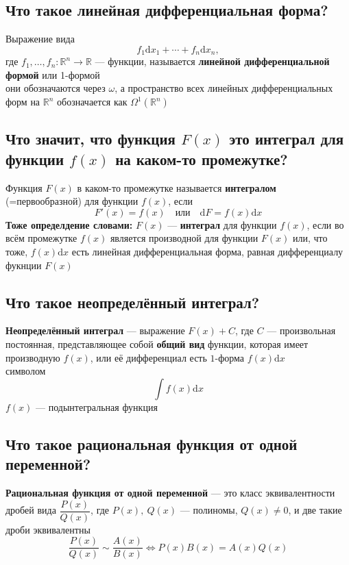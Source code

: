 \documentclass[a4paper]{article}
\begin{document}
\subsection{Что такое линейная дифференциальная форма?}
Выражение вида 
$$
f_1 \mathrm{d}x_1 + \cdots + f_n \mathrm{d}x_n,
$$
где $f_1,\ldots, f_n:\mathbb{R}^n \to \mathbb{R}$ — функции, называется \textbf{линейной дифференциальной формой} или 1-формой\\[2mm]
 они обозначаются через $\omega$, а пространство всех линейных дифференциальных форм на $\mathbb{R}^n$ обозначается как $\Omega^1(\mathbb{R}^n)$

\subsection{Что значит, что функция $F(x)$ это интеграл для функции $f(x)$ на каком-то промежутке?}
Функция $F(x)$ в каком-то промежутке называется \textbf{интегралом} (=первообразной) для функции $f(x)$, если 
$$F'(x) = f(x) \quad \mbox{или} \quad  \mathrm{d}F = f(x) \mathrm{d}x$$
\indent\textbf{Тоже определдение словами:} $F(x)$ — \textbf{интеграл} для функции $f(x)$, если во всём промежутке $f(x)$ является производной для функции $F(x)$ или, что тоже, $f(x)\mathrm{d}x$ есть линейная дифференциальная форма, равная дифференциалу фукнции $F(x)$

\subsection{Что такое неопределённый интеграл?}
\label{1.8}
\textbf{Неопределённый интеграл} — выражение $F(x) + C$, где $C$ — произвольная постоянная, представляющее собой \textbf{общий вид} функции, которая имеет производную $f(x)$, или её дифференциал есть $1$-форма $f(x) \mathrm{d}x$\\[2mm]
 символом
$$
\int f(x) \mathrm{d}x
$$
\indent$f(x)$ — подынтегральная функция

\subsection{Что такое рациональная функция от одной переменной?}
\textbf{Рациональная функция от одной переменной} — это класс эквивалентности дробей вида $\dfrac{P(x)}{Q(x)}$, где $P(x),\ Q(x)$ — полиномы, $Q(x) \ne 0$, и две такие дроби эквивалентны
$$
\frac{P(x)}{Q(x)} \sim \frac{A(x)}{B(x)}\Longleftrightarrow P(x) B(x) = A(x) Q(x)
$$
\end{document}
